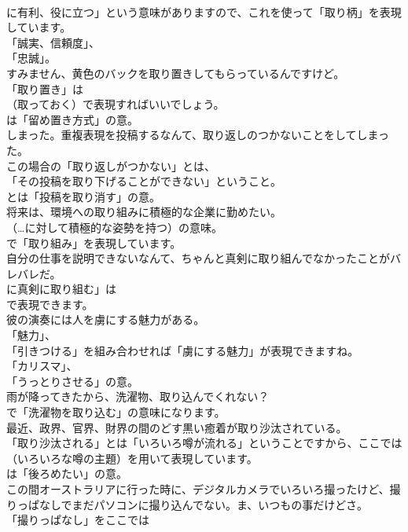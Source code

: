 \documentclass[8pt]{extreport}
\begin{document}
\begin{CJK}{UTF8}{min}
\\	に有利、役に立つ」という意味がありますので、これを使って「取り柄」を表現しています。
\\	「誠実、信頼度」、
\\	「忠誠」。	
\\	すみません、黄色のバックを取り置きしてもらっているんですけど。 
\\	「取り置き」は 
\\	（取っておく）で表現すればいいでしょう。
\\	は「留め置き方式」の意。	
\\	しまった。重複表現を投稿するなんて、取り返しのつかないことをしてしまった。 
\\	この場合の「取り返しがつかない」とは、
\\	「その投稿を取り下げることができない」ということ。
\\	とは「投稿を取り消す」の意。	
\\	将来は、環境への取り組みに積極的な企業に勤めたい。 
\\	（…に対して積極的な姿勢を持つ）の意味。
\\	で「取り組み」を表現しています。	
\\	自分の仕事を説明できないなんて、ちゃんと真剣に取り組んでなかったことがバレバレだ。 
\\	に真剣に取り組む」は
\\	で表現できます。	
\\	彼の演奏には人を虜にする魅力がある。 
\\	「魅力」、
\\	「引きつける」を組み合わせれば「虜にする魅力」が表現できますね。
\\	「カリスマ」、
\\	「うっとりさせる」の意。	
\\	雨が降ってきたから、洗濯物、取り込んでくれない？ 
\\	で「洗濯物を取り込む」の意味になります。	
\\	最近、政界、官界、財界の間のどす黒い癒着が取り沙汰されている。 
\\	「取り沙汰される」とは「いろいろ噂が流れる」ということですから、ここでは 
\\	（いろいろな噂の主題）を用いて表現しています。
\\	は「後ろめたい」の意。	
\\	この間オーストラリアに行った時に、デジタルカメラでいろいろ撮ったけど、撮りっぱなしでまだパソコンに撮り込んでない。ま、いつもの事だけどさ。 
\\	「撮りっぱなし」をここでは

\end{CJK}
\end{document}
